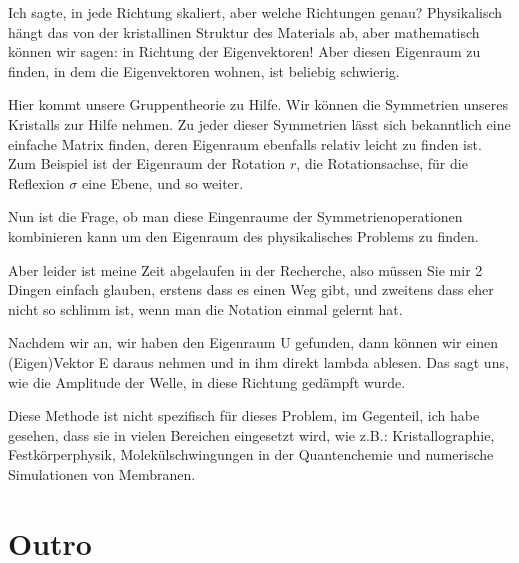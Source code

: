 \documentclass[a4paper]{article}
\newcommand{\scene}[1]{\par\noindent[ #1 ]\par}
\begin{document}
Ich sagte, in jede Richtung skaliert, aber welche Richtungen genau?
Physikalisch hängt das von der kristallinen Struktur des Materials ab, aber
mathematisch können wir sagen: in Richtung der Eigenvektoren!  Aber diesen
Eigenraum zu finden, in dem die Eigenvektoren wohnen, ist beliebig schwierig. 

Hier kommt unsere Gruppentheorie zu Hilfe. Wir können die Symmetrien unseres
Kristalls zur Hilfe nehmen. Zu jeder dieser Symmetrien lässt sich bekanntlich eine
einfache Matrix finden, deren Eigenraum ebenfalls relativ leicht zu finden ist.
Zum Beispiel ist der Eigenraum der Rotation \(r\), die Rotationsachse, für die
Reflexion \(\sigma\) eine Ebene, und so weiter.

Nun ist die Frage, ob man diese Eingenraume der Symmetrienoperationen
kombinieren kann um den Eigenraum des physikalisches Problems zu finden.

Aber leider ist meine Zeit abgelaufen in der Recherche, also müssen Sie mir 2
Dingen einfach glauben, erstens dass es einen Weg gibt, und zweitens dass eher
nicht so schlimm ist, wenn man die Notation einmal gelernt hat.

Nachdem wir an, wir haben den Eigenraum U gefunden, dann können wir einen
(Eigen)Vektor E daraus nehmen und in ihm direkt lambda ablesen. Das sagt uns,
wie die Amplitude der Welle, in diese Richtung gedämpft wurde.

Diese Methode ist nicht spezifisch für dieses Problem, im Gegenteil, ich habe
gesehen, dass sie in vielen Bereichen eingesetzt wird, wie z.B.:
Kristallographie, Festkörperphysik, Molekülschwingungen in der Quantenchemie
und numerische Simulationen von Membranen.

\section{Outro}
\scene{Camera}
\end{document}
